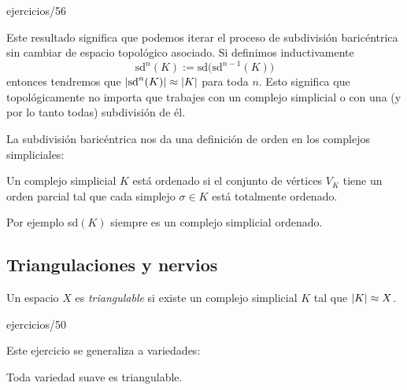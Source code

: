 \documentclass[../../topologia_algebraica]{subfiles}
\begin{document}
{ejercicios/56} %

Este resultado significa que podemos iterar el proceso de subdivisi\'on baric\'entrica sin cambiar
de espacio topol\'ogico asociado. Si definimos inductivamente
\[
	\text{sd}^n(K):=\text{sd}\big(\text{sd}^{n-1}(K)\big)
\]
entonces tendremos que $\left| \text{sd}^n(K) \right|\approx\left| K \right|$ para toda $n$. Esto significa que
topol\'ogicamente no importa que trabajes con un complejo simplicial o con una (y por lo tanto todas)
subdivisi\'on de \'el.

\begin{figure}[h!]%
  \centering
\end{figure}%

La subdivisi\'on baric\'entrica nos da una definici\'on de orden en los complejos simpliciales:

\begin{defin}\label{def:complejo_simplicial_ordenado}
	Un complejo simplicial $K$ est\'a ordenado si el conjunto de v\'ertices $V_K$ tiene un orden
	parcial tal que cada simplejo $\sigma\in K$ est\'a totalmente ordenado.
\end{defin}

Por ejemplo sd$(K)$ siempre es un complejo simplicial ordenado.

\subsection{Triangulaciones y nervios}

\begin{defin}
  Un espacio $X$ es \emph{triangulable} si existe un complejo simplicial $K$ tal que
  $\left| K \right|\approx X$.
\end{defin}

{ejercicios/50} %

Este ejercicio se generaliza a variedades:

\begin{thm}
  Toda variedad suave es triangulable.
\end{thm}
\end{document}
